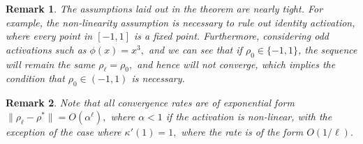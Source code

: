 \documentclass[twoside]{article}
\newtheorem{remark}{Remark}
\theoremstyle{definition}
\begin{document}
\begin{remark}
The assumptions laid out in the theorem are nearly tight. For example, the non-linearity assumption is necessary to rule out identity activation, where every point in $[-1,1]$ is a fixed point. Furthermore, considering odd activations such as $\phi(x) = x^3,$ and we can see that if $\rho_0\in\{-1,1\}$, the sequence will remain the same $\rho_\ell=\rho_0,$ and hence will not converge, which implies the condition that $\rho_0\in(-1,1)$ is necessary. 
\end{remark}

\begin{remark}
Note that all convergence rates are of exponential form $\|\rho_\ell-\rho^*\|= O(\alpha^\ell),$ where $\alpha<1$ if the activation is non-linear, with the exception of the case where $\kappa'(1)=1,$ where the rate is of the form $O(1/\ell).$ 
\end{remark}
\end{document}
